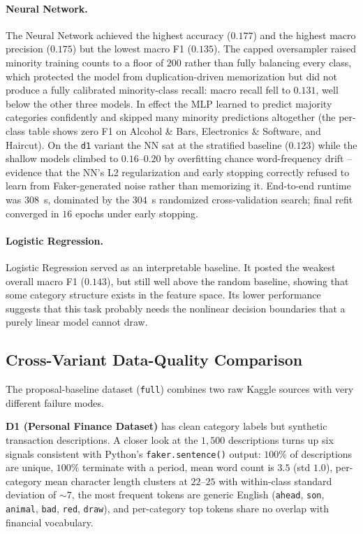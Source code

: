 \documentclass[11pt]{article}
\begin{document}
\paragraph{Neural Network.}
The Neural Network achieved the highest accuracy ($0.177$) and the highest
macro precision ($0.175$) but the lowest macro F1 ($0.135$). The capped
oversampler raised minority training counts to a floor of $200$ rather than
fully balancing every class, which protected the model from
duplication-driven memorization but did not produce a fully calibrated
minority-class recall: macro recall fell to $0.131$, well below the other
three models. In effect the MLP learned to predict majority categories
confidently and skipped many minority predictions altogether (the per-class
table shows zero F1 on Alcohol \& Bars, Electronics \& Software, and
Haircut). On the \texttt{d1} variant the NN sat at the stratified
baseline ($0.123$) while the shallow models climbed to $0.16$--$0.20$
by overfitting chance word-frequency drift -- evidence that the NN's L2
regularization and early stopping correctly refused to learn from
Faker-generated noise rather than memorizing it. End-to-end runtime
was $308$~s, dominated by the $304$~s randomized cross-validation search;
final refit converged in $16$ epochs under early stopping.

\paragraph{Logistic Regression.}
Logistic Regression served as an interpretable baseline. It posted the
weakest overall macro F1 ($0.143$), but still well above the random
baseline, showing that some category structure exists in the feature
space. Its lower performance suggests that this task probably needs the
nonlinear decision boundaries that a purely linear model cannot draw.

\subsection{Cross-Variant Data-Quality Comparison}
\label{sec:ablation}

The proposal-baseline dataset (\texttt{full}) combines two raw Kaggle
sources with very different failure modes.

\textbf{D1 (Personal Finance Dataset)} has clean category labels but
synthetic transaction descriptions. A closer look at the $1{,}500$
descriptions turns up six signals consistent with Python's
\texttt{faker.sentence()} output: $100\%$ of descriptions are unique,
$100\%$ terminate with a period, mean word count is $3.5$ (std $1.0$),
per-category mean character length clusters at $22$--$25$ with within-class
standard deviation of $\sim$$7$, the most frequent tokens are generic
English (\texttt{ahead}, \texttt{son}, \texttt{animal}, \texttt{bad},
\texttt{red}, \texttt{draw}), and per-category top tokens share no overlap
with financial vocabulary.
\end{document}

